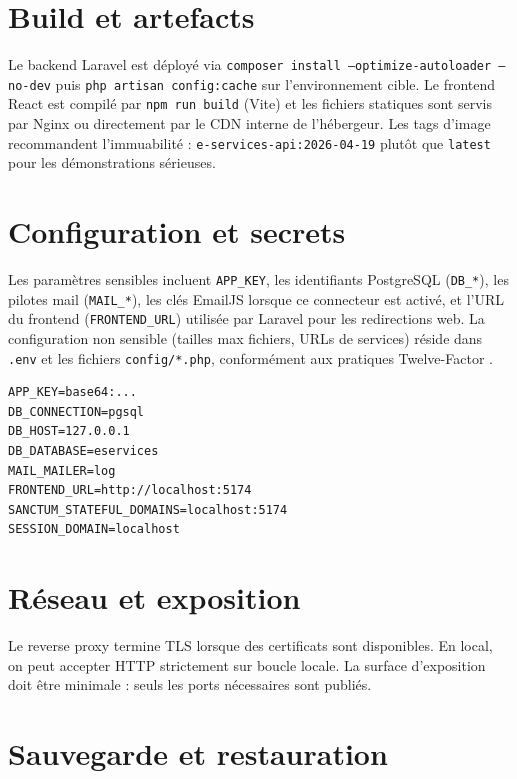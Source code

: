 \section{Build et artefacts}

Le backend Laravel est déployé via \texttt{composer install --optimize-autoloader --no-dev} puis \texttt{php artisan config:cache} sur l'environnement cible. Le frontend React est compilé par \texttt{npm run build} (Vite) et les fichiers statiques sont servis par Nginx ou directement par le CDN interne de l'hébergeur. Les tags d'image recommandent l'immuabilité : \texttt{e-services-api:2026-04-19} plutôt que \texttt{latest} pour les démonstrations sérieuses.

\section{Configuration et secrets}

Les paramètres sensibles incluent \texttt{APP\_KEY}, les identifiants PostgreSQL (\texttt{DB\_*}), les pilotes mail (\texttt{MAIL\_*}), les clés EmailJS lorsque ce connecteur est activé, et l'URL du frontend (\texttt{FRONTEND\_URL}) utilisée par Laravel pour les redirections web. La configuration non sensible (tailles max fichiers, URLs de services) réside dans \texttt{.env} et les fichiers \texttt{config/*.php}, conformément aux pratiques Twelve-Factor \cite{laraveldoc,twelvefactor}.

\begin{lstlisting}[caption={Exemple de paramètres externalisables (fichier \texttt{.env}, illustration).}, label={lst:env-example}]
APP_KEY=base64:...
DB_CONNECTION=pgsql
DB_HOST=127.0.0.1
DB_DATABASE=eservices
MAIL_MAILER=log
FRONTEND_URL=http://localhost:5174
SANCTUM_STATEFUL_DOMAINS=localhost:5174
SESSION_DOMAIN=localhost
\end{lstlisting}

\section{Réseau et exposition}

Le reverse proxy termine TLS lorsque des certificats sont disponibles. En local, on peut accepter HTTP strictement sur boucle locale. La surface d'exposition doit être minimale : seuls les ports nécessaires sont publiés.

\section{Sauvegarde et restauration}

